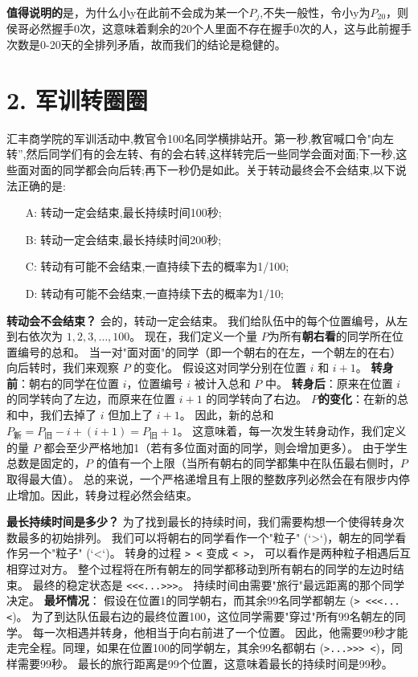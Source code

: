 \documentclass[UTF8]{ctexart}
\begin{document}
\textbf{值得说明的}是，为什么小y在此前不会成为某一个$P_{j}$,不失一般性，令小y为$P_{20}$，则侯哥必然握手0次，这意味着剩余的20个人里面不存在握手0次的人，这与此前握手次数是0-20天的全排列矛盾，故而我们的结论是稳健的。

\section*{2. 军训转圈圈}

汇丰商学院的军训活动中,教官令100名同学横排站开。第一秒,教官喊口令"向左转”,然后同学们有的会左转、有的会右转,这样转完后一些同学会面对面;下一秒,这些面对面的同学都会向后转;再下一秒仍是如此。关于转动最终会不会结束,以下说法正确的是:
\begin{itemize}
    \item[A:] 转动一定会结束,最长持续时间100秒;
    \item[B:] 转动一定会结束,最长持续时间200秒;
    \item[C:] 转动有可能不会结束,一直持续下去的概率为1/100;
    \item[D:] 转动有可能不会结束,一直持续下去的概率为1/10;
\end{itemize}



\textbf{转动会不会结束？} 会的，转动一定会结束。
我们给队伍中的每个位置编号，从左到右依次为 $1, 2, 3, \dots, 100$。
现在，我们定义一个量 $P$为所有\textbf{朝右看}的同学所在位置编号的总和。
当一对"面对面"的同学（即一个朝右的在左，一个朝左的在右）
向后转时，我们来观察 $P$ 的变化。
假设这对同学分别在位置 $i$ 和 $i+1$。
\textbf{转身前}：朝右的同学在位置 $i$，位置编号 $i$ 被计入总和 $P$ 中。
\textbf{转身后}：原来在位置 $i$ 的同学转向了左边，而原来在位置 $i+1$ 的同学转向了右边。
\textbf{$P$的变化}：在新的总和中，我们去掉了 $i$ 但加上了 $i+1$。
因此，新的总和 $P_{\text{新}} = P_{\text{旧}} - i + (i+1) = P_{\text{旧}} + 1$。
这意味着，每一次发生转身动作，我们定义的量 $P$ 都会至少严格地加1（若有多位面对面的同学，则会增加更多）。
由于学生总数是固定的，$P$ 的值有一个上限（当所有朝右的同学都集中在队伍最右侧时，$P$ 取得最大值）。
总的来说，一个严格递增且有上限的整数序列必然会在有限步内停止增加。因此，转身过程必然会结束。

\textbf{最长持续时间是多少？} 为了找到最长的持续时间，我们需要构想一个使得转身次数最多的初始排列。
我们可以将朝右的同学看作一个"粒子" (`>`)，朝左的同学看作另一个"粒子" (`<`)。
转身的过程 \texttt{> <} 变成 \texttt{< >}，
可以看作是两种粒子相遇后互相穿过对方。
整个过程将在所有朝左的同学都移动到所有朝右的同学的左边时结束。
最终的稳定状态是 \texttt{<<<...>>>}。
持续时间由需要"旅行"最远距离的那个同学决定。
\textbf{最坏情况}：
假设在位置1的同学朝右，而其余99名同学都朝左 (\texttt{> <<<...<})。
为了到达队伍最右边的最终位置100，这位同学需要"穿过"所有99名朝左的同学。
每一次相遇并转身，他相当于向右前进了一个位置。
因此，他需要99秒才能走完全程。同理，如果在位置100的同学朝左，其余99名都朝右 (\texttt{>...>>> <})，同样需要99秒。
最长的旅行距离是99个位置，这意味着最长的持续时间是99秒。
\end{document}
